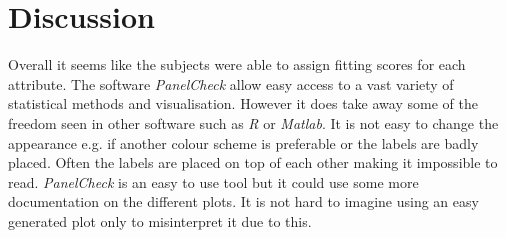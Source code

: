 \section*{Discussion}
\label{discussion}
%
Overall it seems like the subjects were able to assign fitting scores for each attribute. The software  \textit{PanelCheck} allow easy access to a vast variety of statistical methods and visualisation. However it does take away some of the freedom seen in other software such as \textit{R} or \textit{Matlab}. It is not easy to change the appearance e.g. if another colour scheme is preferable or the labels are badly placed. Often the labels are placed on top of each other making it impossible to read. \textit{PanelCheck} is an easy to use tool but it could use some more documentation on the different plots. It is not hard to imagine using an easy generated plot only to misinterpret it due to this. 